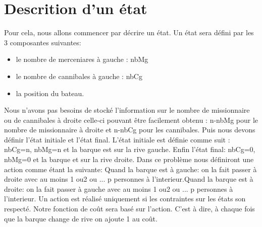 \documentclass[a4paper, 12pt, french,oneside]{book}
\begin{document}
\section{Descrition d'un état}
Pour cela, nous allons commencer par décrire un état. Un état sera défini par les 3 composantes suivantes:
\begin{itemize}
    \item le nombre de merceniares à gauche : nbMg
    \item le nombre de cannibales à gauche : nbCg
    \item la position du bateau.
\end{itemize}
Nous n'avons pas besoins de stocké l'information sur le nombre de missionnaire ou de cannibales à droite celle-ci pouvant être facilement obtenu : n-nbMg pour le nombre de missionnaire à droite et n-nbCg pour les cannibales. Puis nous devons définir l'état initiale et l'état final. L'état initiale est définie comme suit : nbCg=n, nbMg=n et la barque est sur la rive gauche. Enfin l'état final: nbCg=0, nbMg=0 et la barque et sur la rive droite. Dans ce problème nous définiront une action comme étant la suivante: Quand la barque est à gauche: on la fait passer à droite avec au moins 1 ou2 ou ... p personnes à l'interieur.Quand la barque est à droite: on la fait passer à gauche avec au moins 1 ou2 ou ... p personnes à l'interieur. Un action est réalisé uniquement si les contraintes sur les états son respecté. Notre fonction de coût sera basé sur l'action. C'est à dire, à chaque fois que la barque change de rive on ajoute 1 au coût.
\end{document}
